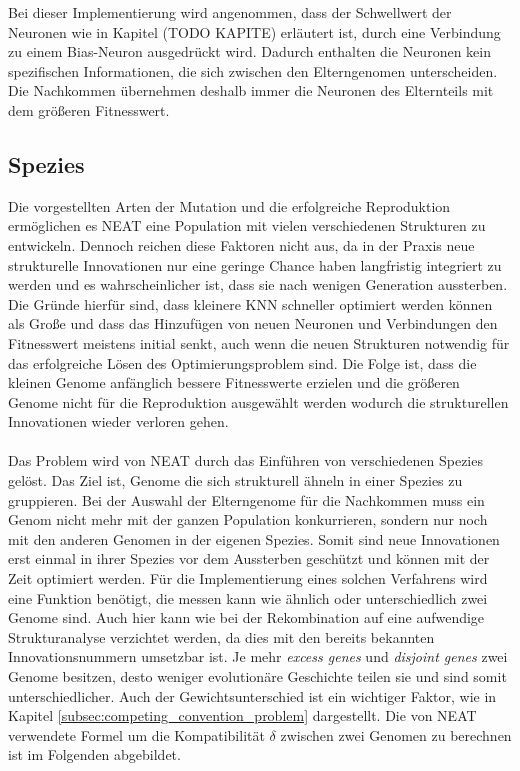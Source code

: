 Bei dieser Implementierung wird angenommen, dass der Schwellwert der Neuronen wie in Kapitel (TODO KAPITE) erläutert ist, durch eine Verbindung zu einem Bias-Neuron ausgedrückt wird. Dadurch enthalten die Neuronen kein spezifischen Informationen, die sich zwischen den Elterngenomen unterscheiden. Die Nachkommen übernehmen deshalb immer die Neuronen des Elternteils mit dem größeren Fitnesswert.
\subsection{Spezies}
Die vorgestellten Arten der Mutation und die erfolgreiche Reproduktion ermöglichen es \ac{NEAT} eine Population mit vielen verschiedenen Strukturen zu entwickeln. Dennoch reichen diese Faktoren nicht aus, da in der Praxis neue strukturelle Innovationen nur eine geringe Chance haben langfristig integriert zu werden und es wahrscheinlicher ist, dass sie nach wenigen Generation aussterben. Die Gründe hierfür sind, dass kleinere \ac{KNN} schneller optimiert werden können als Große und dass das Hinzufügen von neuen Neuronen und Verbindungen den Fitnesswert meistens initial senkt, auch wenn die neuen Strukturen notwendig für das erfolgreiche Lösen des Optimierungsproblem sind. Die Folge ist, dass die kleinen Genome anfänglich bessere Fitnesswerte erzielen und die größeren Genome nicht für die Reproduktion ausgewählt werden wodurch die strukturellen Innovationen wieder verloren gehen.
\\\\
Das Problem wird von \ac{NEAT} durch das Einführen von verschiedenen Spezies gelöst. Das Ziel ist, Genome die sich strukturell ähneln in einer Spezies zu gruppieren. Bei der Auswahl der Elterngenome für die Nachkommen muss ein Genom nicht mehr mit der ganzen Population konkurrieren, sondern nur noch mit den anderen Genomen in der eigenen Spezies. Somit sind neue Innovationen erst einmal in ihrer Spezies vor dem Aussterben geschützt und können mit der Zeit optimiert werden. Für die Implementierung eines solchen Verfahrens wird eine Funktion benötigt, die messen kann wie ähnlich oder unterschiedlich zwei Genome sind. Auch hier kann wie bei der Rekombination auf eine aufwendige Strukturanalyse verzichtet werden, da dies mit den bereits bekannten Innovationsnummern umsetzbar ist. Je mehr \emph{excess genes} und \emph{disjoint genes} zwei Genome besitzen, desto weniger evolutionäre Geschichte teilen sie und sind somit unterschiedlicher. Auch der Gewichtsunterschied ist ein wichtiger Faktor, wie in Kapitel \ref{subsec:competing_convention_problem} dargestellt. Die von \ac{NEAT} verwendete Formel um die Kompatibilität $\delta$ zwischen zwei Genomen zu berechnen ist im Folgenden abgebildet.
